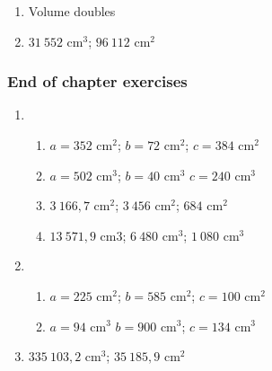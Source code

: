 {\begin{multicols}{3}
\begin{enumerate}[noitemsep, label=\textbf{\arabic*}. ] 
 \item Volume doubles%
\setcounter{enumi}{2}
\item $31~ 552$ cm$^3$; $96~ 112$ cm$^2$ %
\end{enumerate}

\subsubsection*{End of chapter exercises} %
\begin{enumerate}[noitemsep, label=\textbf{\arabic*}. ] 
\item %
      \begin{enumerate}[noitemsep, label=\textbf{(\alph*)} ]
	  \item $a = 352$ cm$^2$; $b = 72$ cm$^2$; $c= 384$ cm$^2$%
	  \item $a = 502$ cm$^3$; $b = 40$ cm$^3$ $c = 240$ cm$^3$%
\item $3~166,7$ cm$^2$; $3~456$ cm$^2$; $684$ cm$^2$%
\item $13~571,9$ cm$3$; $6~480$ cm$^3$; $1~080$ cm$^3$ %
      \end{enumerate}
\item %
      \begin{enumerate}[noitemsep, label=\textbf{(\alph*)} ]
	  \item $a = 225$ cm$^2$; $b = 585$ cm$^2$; $c = 100$ cm$^2$%
	  \item $a = 94$ cm$^3$ $b = 900$ cm$^3$; $c = 134$ cm$^3$ %
      \end{enumerate}
\item $335~103,2$ cm$^3$; $35~185,9$ cm$^2$%
\end{enumerate}
\end{multicols}

}
